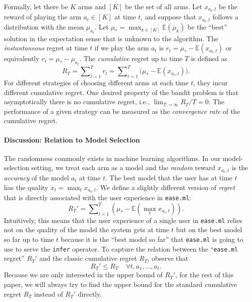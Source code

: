 \documentclass[letterpaper]{vldb}
\newcommand{\eml}{\texttt{ease.ml}\xspace}
\newcommand{\E}{\mathbb{E}}
\begin{document}
Formally, let there be $K$ arms and $[K]$ be the set of
all arms. Let $x_{a_t, t}$ be the reward of playing the arm $a_t\in[K]$
at time $t$, and suppose that $x_{a_t, t}$ follows a distribution with the mean $\mu_{a_t}$. %
Let $\mu_*=\max_{k\in[K]}\mathbb{E}(\mu_k)$ be the ``best'' solution in the expectation sense that is unknown to the algorithm.
The {\em instantaneous} regret at time $t$ if we
play the arm $a_t$ is $r_t=\mu_*-\E(x_{a_t, t})$ or equivalently $r_t = \mu_*-\mu_{a_t}$.
The {\em cumulative} regret up to time $T$ is defined as
\[
R_{T}=\sum\nolimits_{t=1}^{T}r_t = \sum\nolimits_{t=1}^{T}\Big(\mu_*-\E(x_{a_t, t})\Big).
\]
For different strategies of choosing different arms at
each time $t$, they incur different cumulative regret.
One desired property of the bandit problem is 
that asymptotically there is no cumulative regret, i.e.,
$\lim\nolimits_{T\to\infty}R_T/T=0.$ The performance
of a given strategy can be measured as the {\em convergence rate}
of the cumulative regret.



\vspace{-1em}
\paragraph*{Discussion: Relation to Model Selection} 
The randomness commonly exists in  machine learning algorithms. 
In our model-selection setting, we treat each arm as
a model and the {\em random} reward $x_{a_t, t}$ is the {\em accuracy} of
the model $a_t$ at time $t$. 
The best model that the user
has at time $t$ has the quality $x_t = \max_t x_{a_t, t}$. We
define a slightly different version of {\em regret} that is
directly associated with the user experience in \eml:
\[
R_{T}' = \sum\nolimits_{t=1}^{T} \left(\mu_* -  \mathbb{E}(\max_t x_{a_t, t})\right).
\]
Intuitively, this means that the user experience of a single
user in \eml relies not on the quality of the model the system
gets at time $t$ but on the best model so far up to time $t$ because
it is the ``best model so far'' that \eml is going to use 
to serve the \texttt{infer} operator. To
capture the relation between the ``\eml regret'' $R_T'$ and 
the classic cumulative regret $R_T$, observe that
\[
R_T' \leq R_T~~~~~\forall t, a_1,...,a_t.
\]
Because we are only interested in
the upper bound of $R_T'$, for the rest of this paper,
we will always try to find the upper bound for 
the standard cumulative regret $R_T$ instead of 
$R_T'$ directly.
\end{document}
